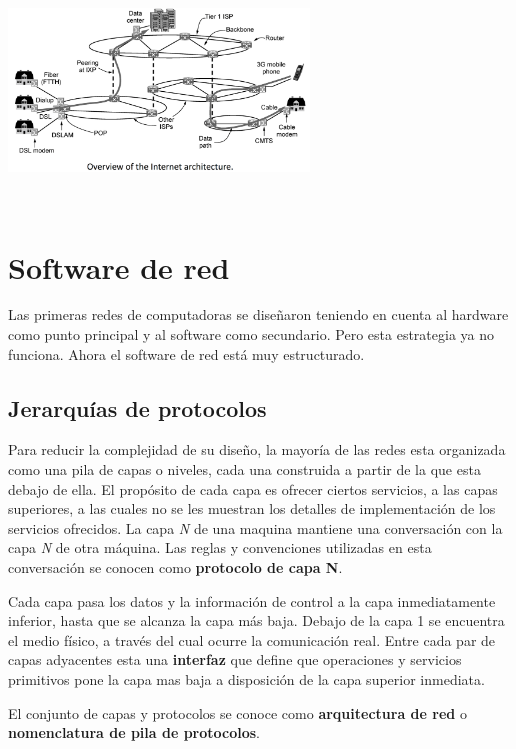 \documentclass[10pt,a4paper]{report}
\begin{document}
\begin{center} 
	\includegraphics[width=8cm, height=6cm]{./imagenes/interred.png} 
\end{center}

\section{Software de red}
	\par Las primeras redes de computadoras se diseñaron teniendo en cuenta al hardware 
como punto principal y al software como secundario. Pero esta estrategia ya no 
funciona. Ahora el software de red está muy estructurado.

\subsection{Jerarquías de protocolos}
\par Para reducir la complejidad de su diseño, la mayoría de las redes esta organizada 
como una pila de capas o niveles, cada una construida a partir de la que esta debajo de 
ella. El propósito de cada capa es ofrecer ciertos servicios, a las capas superiores, a las 
cuales no se les muestran los detalles de implementación de los servicios ofrecidos. La 
capa \textit{N} de una maquina mantiene una conversación con la capa \textit{N} de 
otra máquina. Las reglas y convenciones utilizadas en esta conversación se conocen 
como \textbf{protocolo de capa N}.
\par Cada capa pasa los datos y la información de control a la capa inmediatamente 
inferior, hasta que se alcanza la capa más baja. Debajo de la capa 1 se encuentra el 
medio físico, a través del cual ocurre la comunicación real. Entre cada par de capas 
adyacentes esta una \textbf{interfaz} que define que operaciones y servicios 
primitivos pone la capa mas baja a disposición de la capa superior inmediata.
\par El conjunto de capas y protocolos se conoce como \textbf{arquitectura de red} o 
\textbf{nomenclatura de pila de protocolos}.
\end{document}
